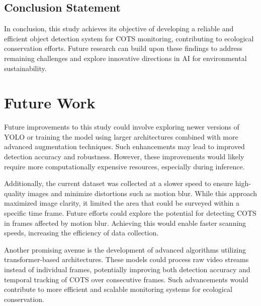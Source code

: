 \documentclass[conference]{IEEEtran}
\begin{document}
\subsection{Conclusion Statement}
In conclusion, this study achieves its objective of developing a reliable and efficient object detection system for COTS monitoring, contributing to ecological conservation efforts. Future research can build upon these findings to address remaining challenges and explore innovative directions in AI for environmental sustainability.


\section{Future Work}
Future improvements to this study could involve exploring newer versions of YOLO or training the model using larger architectures combined with more advanced augmentation techniques. Such enhancements may lead to improved detection accuracy and robustness. However, these improvements would likely require more computationally expensive resources, especially during inference.

Additionally, the current dataset was collected at a slower speed to ensure high-quality images and minimize distortions such as motion blur. While this approach maximized image clarity, it limited the area that could be surveyed within a specific time frame. Future efforts could explore the potential for detecting COTS in frames affected by motion blur. Achieving this would enable faster scanning speeds, increasing the efficiency of data collection.

Another promising avenue is the development of advanced algorithms utilizing transformer-based architectures. These models could process raw video streams instead of individual frames, potentially improving both detection accuracy and temporal tracking of COTS over consecutive frames. Such advancements would contribute to more efficient and scalable monitoring systems for ecological conservation.
\end{document}
